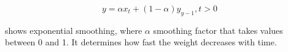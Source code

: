 \begin{equation}
    \label{eq:exponential_smoothing}
    y = \alpha x_t + (1 - \alpha)y_{y-1}, t > 0
\end{equation}

shows exponential smoothing, where $\alpha$ smoothing factor
that takes values between 0 and 1. It determines how fast the weight decreases with time.




